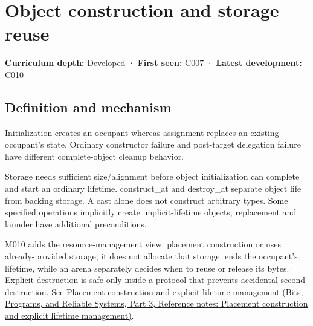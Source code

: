 \hypertarget{appendix-a82f9c438857}{}\label{referencestart:appendix-a82f9c438857}
\section{Object construction and storage reuse}\label{appendix-a82f9c438857-object-construction-and-storage-reuse}

\hypertarget{appendix-a82f9c438857-object-construction-and-storage-reuse}{}

\textbf{Curriculum depth:} Developed · \textbf{First seen:} C007 · \textbf{Latest development:} C010

\begin{allmightroledefinition}

\subsection{Definition and mechanism}\label{appendix-a82f9c438857-definition-and-mechanism}

\hypertarget{appendix-a82f9c438857-definition-and-mechanism}{}

Initialization creates an occupant whereas assignment replaces an existing occupant's state. Ordinary constructor failure and post-target delegation failure have different complete-object cleanup behavior.

\end{allmightroledefinition}

Storage needs sufficient size/alignment before object initialization can complete and start an ordinary lifetime. construct\_at and destroy\_at separate object life from backing storage. A cast alone does not construct arbitrary types. Some specified operations implicitly create implicit-lifetime objects; replacement and launder have additional preconditions.

M010 adds the resource-management view: placement construction or  uses already-provided storage; it does not allocate that storage.  ends the occupant's lifetime, while an arena separately decides when to reuse or release its bytes. Explicit destruction is safe only inside a protocol that prevents accidental second destruction. See \href{../01-Bits-Programs-and-Reliable-Systems-P03/main.pdf\#nameddest=appendix-f56c3e43fd4e}{Placement construction and explicit lifetime management (Bits, Programs, and Reliable Systems, Part 3, Reference notes: Placement construction and explicit lifetime management)}.


